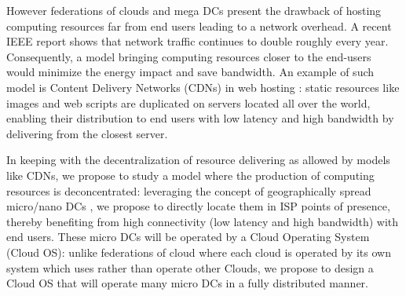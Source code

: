 However federations of clouds and mega DCs present the drawback of hosting 
computing resources far from end users leading to a network overhead. A recent 
IEEE report \cite{ieeenetreport:2012} shows that network traffic continues to 
double roughly every year. Consequently, a model bringing computing resources 
closer to the end-users would minimize the energy impact and save bandwidth. An
example of such model is Content Delivery Networks (CDNs) in web hosting : 
static resources like images and web scripts are duplicated on servers located
all over the world, enabling their distribution to end users with low latency 
and high bandwidth by delivering from the closest server.

In keeping with the decentralization of resource delivering as allowed by models
like CDNs, we propose to study a model where the production of computing 
resources is deconcentrated: leveraging the concept of geographically spread 
micro/nano DCs \cite{greenberg:2008}, we propose to directly locate them in ISP 
points of presence, thereby benefiting from high connectivity (low latency and
high bandwidth) with end users. These micro DCs will be operated by a Cloud
Operating System (Cloud OS): unlike federations of cloud where each cloud is
operated by its own system which uses rather than operate other Clouds, we 
propose to design a Cloud OS that will operate many micro DCs in a fully 
distributed manner.

